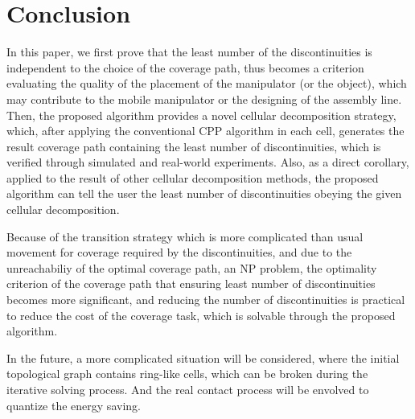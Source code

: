 \documentclass[journal]{IEEEtran}
\begin{document}
\section{Conclusion}\label{sectionconclusion}
In this paper, we first prove that the least number of the discontinuities is independent to the choice of the coverage path, thus becomes a criterion evaluating the quality of the placement of the manipulator (or the object), which may contribute to the mobile manipulator or the designing of the assembly line. Then, the proposed algorithm provides a novel cellular decomposition strategy, which, after applying the conventional CPP algorithm in each cell, generates the result coverage path containing the least number of discontinuities, which is verified through simulated and real-world experiments. 
Also, as a direct corollary, applied to the result of other cellular decomposition methods, the proposed algorithm can tell the user the least number of discontinuities obeying the given cellular decomposition. 

Because of the transition strategy which is more complicated than usual movement for coverage required by the discontinuities, and due to the unreachabiliy of the optimal coverage path, an NP problem, the optimality criterion of the coverage path that ensuring least number of discontinuities becomes more significant, and reducing the number of discontinuities is practical to reduce the cost of the coverage task, which is solvable through the proposed algorithm. 

In the future, a more complicated situation will be considered, where the initial topological graph contains ring-like cells, which can be broken during the iterative solving process. And the real contact process will be envolved to quantize the energy saving.









%
%
\end{document}
